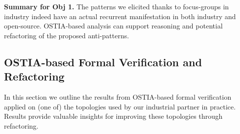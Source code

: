 \documentclass[smallextended]{svjour3}       %
\newcommand{\comment}[1]{{\textbf{\color{red}[#1]}}}
\begin{document}
\begin{framed}
\textbf{Summary for Obj 1.} The patterns we elicited thanks to focus-groups in industry indeed have an actual recurrent manifestation in both industry and open-source. OSTIA-based analysis can support reasoning and potential refactoring of the proposed anti-patterns.
\end{framed}
%
%

\subsection{OSTIA-based Formal Verification and Refactoring}

In this section we outline the results from OSTIA-based formal verification applied on (one of) the topologies used by our industrial partner in practice. 
Results provide valuable insights for improving these topologies through refactoring.
\end{document}
